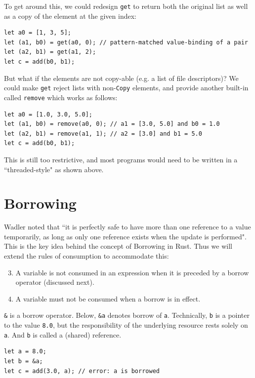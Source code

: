 \documentclass[11pt]{report}
\begin{document}
To get around this, we could redesign \texttt{get} to return both the original list as well as a copy of the element at the given index:

\begin{lstlisting}
let a0 = [1, 3, 5];
let (a1, b0) = get(a0, 0); // pattern-matched value-binding of a pair
let (a2, b1) = get(a1, 2);
let c = add(b0, b1);
\end{lstlisting}

But what if the elements are not copy-able (e.g. a list of file descriptors)? We could make \texttt{get} reject lists with non-\texttt{Copy} elements, and provide another built-in called \texttt{remove} which works as follows:

\begin{lstlisting}
let a0 = [1.0, 3.0, 5.0];
let (a1, b0) = remove(a0, 0); // a1 = [3.0, 5.0] and b0 = 1.0
let (a2, b1) = remove(a1, 1); // a2 = [3.0] and b1 = 5.0
let c = add(b0, b1);
\end{lstlisting}

This is still too restrictive, and most programs would need to be written in a ``threaded-style" as shown above.

\section*{Borrowing}

Wadler noted that ``it is perfectly safe to have more than one reference to a value temporarily, as long as only one reference exists when the update is performed"\cite{linearchange}. This is the key idea behind the concept of Borrowing in Rust. Thus we will extend the rules of consumption to accommodate this:

\begin{enumerate}
\setcounter{enumi}{2}
\item A variable is not consumed in an expression when it is preceded by a borrow operator (discussed next).
\item A variable must not be consumed when a borrow is in effect.
\end{enumerate}

\texttt{\&} is a borrow operator. Below, \texttt{\&a} denotes borrow of \texttt{a}. Technically, \texttt{b} is a pointer to the value \texttt{8.0}, but the responsibility of the underlying resource rests solely on \texttt{a}. And \texttt{b} is called a (shared) reference.

\begin{lstlisting}
let a = 8.0;
let b = &a;
let c = add(3.0, a); // error: a is borrowed
\end{lstlisting}
\end{document}
